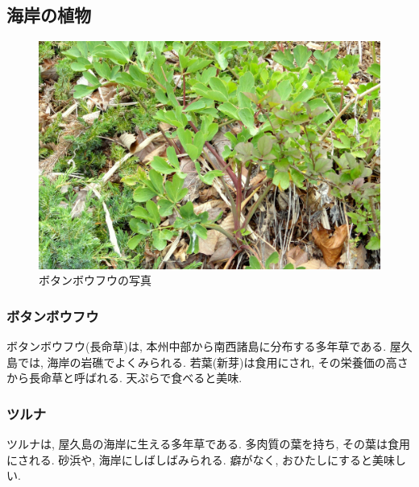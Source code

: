 \documentclass[10pt,titlepage,a5paper]{ltjsbook}
\begin{document}
  \subsection{海岸の植物}
    \begin{minipage}{0.38\columnwidth}
      \begin{figure}[H]
            \centering
            \includegraphics[width=\columnwidth]{botanbouhuu.jpg}
            \caption{ボタンボウフウの写真}
            \label{fig:botanbouhuu_photo}
        \end{figure}
    \end{minipage}
    \hfill
    \begin{minipage}{0.58\columnwidth}
      \subsubsection*{ボタンボウフウ}
      ボタンボウフウ(長命草)は, 本州中部から南西諸島に分布する多年草である. 屋久島では, 海岸の岩礁でよくみられる. 若葉(新芽)は食用にされ, その栄養価の高さから長命草と呼ばれる. 天ぷらで食べると美味. 
    \end{minipage}
    \begin{minipage}{0.58\columnwidth}
      \subsubsection*{ツルナ}
        ツルナは, 屋久島の海岸に生える多年草である. 多肉質の葉を持ち, その葉は食用にされる. 砂浜や, 海岸にしばしばみられる. 癖がなく, おひたしにすると美味しい.
    \end{minipage}
    \hfill
\end{document}
